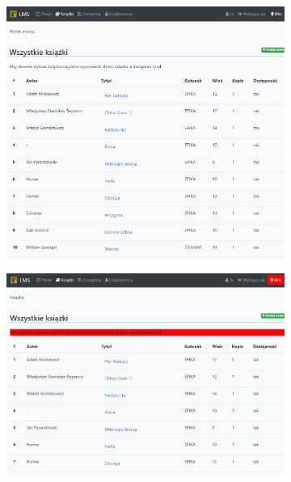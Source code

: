 \begin{figure}[H]
    \centering
    \begin{subfigure}[b]{0.4\textwidth}
        \includegraphics[width=\textwidth]{images/books}
        \label{fig:book}
    \end{subfigure}
    \hfill
    \begin{subfigure}[b]{0.4\textwidth}
        \includegraphics[width=\textwidth]{images/book1}
        \label{fig:book1}
    \end{subfigure}
    \label{fig:book-oss}
\end{figure}

